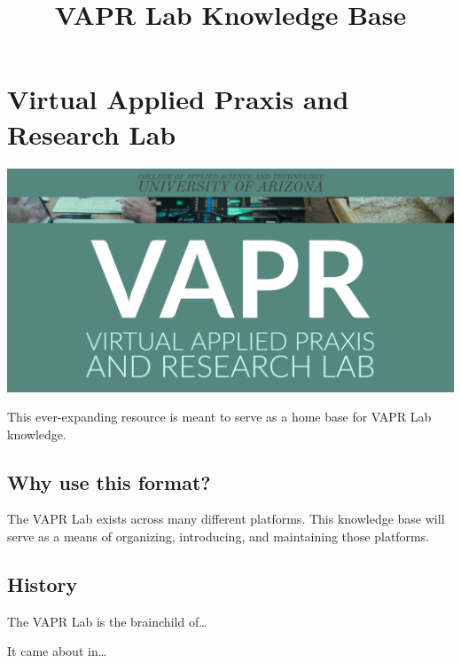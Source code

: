 \documentclass[12pt,]{memoir}
\title{VAPR Lab Knowledge Base}
\author{}
\date{}
\begin{document}
\maketitle

{
\hypersetup{linkcolor=black}
\setcounter{tocdepth}{1}
\tableofcontents
}
\listoftables
\listoffigures
\hypertarget{virtual-applied-praxis-and-research-lab}{%
\chapter*{Virtual Applied Praxis and Research Lab}\label{virtual-applied-praxis-and-research-lab}}

\includegraphics[width=30in]{images/VAPR-brand-banner}

This ever-expanding resource is meant to serve as a home base for VAPR Lab knowledge.

\hypertarget{why-use-this-format}{%
\section*{Why use this format?}\label{why-use-this-format}}

The VAPR Lab exists across many different platforms. This knowledge base will serve as a means of organizing, introducing, and maintaining those platforms.

\hypertarget{history}{%
\section*{History}\label{history}}

The VAPR Lab is the brainchild of\ldots{}

It came about in\ldots{}
\end{document}
